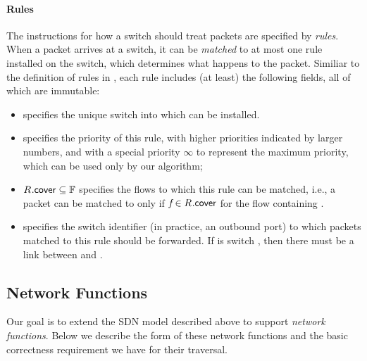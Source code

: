 \paragraph{Rules}
The instructions for how a switch should treat packets are specified
by \textit{rules}.  When a packet arrives at a switch, it can be
\textit{matched} to at most one rule installed on the switch, which
determines what happens to the packet.  Similiar to the definition of rules in , each rule  includes
(at least) the following fields, all of which are immutable:
\begin{itemize}[nosep,leftmargin=1em,labelwidth=*,align=left]
\item {} specifies the unique switch
  \switchID{} into which  can be installed.

\item {} specifies the priority of this rule,
  with higher priorities indicated by larger numbers, and with a
  special priority $\infty$ to represent the maximum priority, which
  can be used only by our algorithm;

\item $\ruleID{}{\coverField} \subseteq \flowSpace$ specifies the
  flows to which this rule can be matched, i.e., a packet \pktID{} can
  be matched to  only if $\flowID{} \in
  \ruleID{}{\coverField}$ for the flow \flowID{} containing \pktID{}.

\item {} specifies the switch identifier (in
  practice, an outbound port) to which packets matched to this rule
  should be forwarded.  If  is switch
  \switchID{\switchIdx}, then there must be a link between
   and \switchID{\switchIdx}.
\end{itemize}

\subsection{Network Functions}
\label{sec:goals:correctness}

Our goal is to extend the SDN model described above to support
\textit{network functions}.  Below we describe the form of these
network functions and the basic correctness requirement we have for
their traversal.

